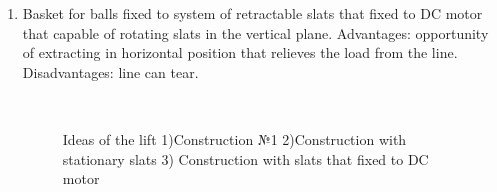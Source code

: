 \begin{enumerate}
\begin{enumerate}
\begin{enumerate}
\begin{enumerate}
	      \item Basket for balls fixed to system of retractable slats that fixed to DC motor that capable of rotating slats in the vertical plane. Advantages: opportunity of extracting in horizontal position that relieves the load from the line. Disadvantages: line can tear.
	      \begin{figure}[H]
	      	\begin{minipage}[h]{0.2\linewidth}
	      		\center  
	      	\end{minipage}
	      	\begin{minipage}[h]{0.6\linewidth}
	      		\caption{Ideas of the lift 1)Construction №1 2)Construction with stationary slats 3) Construction with slats that fixed to DC motor}
	      	\end{minipage}
	      \end{figure}
	      

\end{enumerate}
\end{enumerate}
\end{enumerate}
\end{enumerate}
